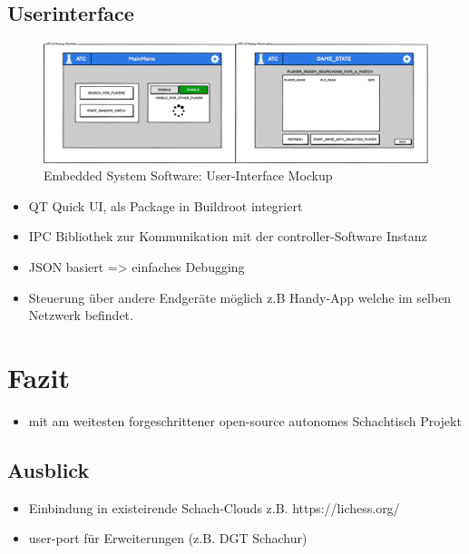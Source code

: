 \hypertarget{userinterface}{%
\subsection{Userinterface}\label{userinterface}}

\begin{figure}
\centering
\includegraphics{images/ATC_Gui.png}
\caption{Embedded System Software: User-Interface Mockup}
\end{figure}

\begin{itemize}
\tightlist
\item
  QT Quick UI, als Package in Buildroot integriert
\item
  IPC Bibliothek zur Kommunikation mit der controller-Software Instanz
\item
  JSON basiert =\textgreater{} einfaches Debugging
\item
  Steuerung über andere Endgeräte möglich z.B Handy-App welche im selben
  Netzwerk befindet.
\end{itemize}

\hypertarget{fazit}{%
\section{Fazit}\label{fazit}}

\begin{itemize}
\tightlist
\item
  mit am weitesten forgeschrittener open-source autonomes Schachtisch
  Projekt
\end{itemize}

\hypertarget{ausblick}{%
\subsection{Ausblick}\label{ausblick}}

\begin{itemize}
\tightlist
\item
  Einbindung in existeirende Schach-Clouds z.B. https://lichess.org/
\item
  user-port für Erweiterungen (z.B. DGT Schachur)
\end{itemize}
